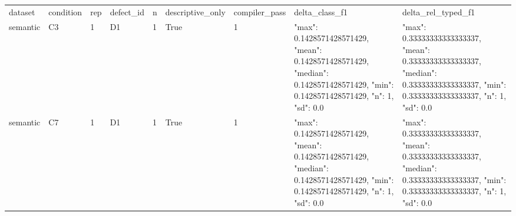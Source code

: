 \begin{tabular}{lllllllll}
dataset & condition & rep & defect\_id & n & descriptive\_only & compiler\_pass & delta\_class\_f1 & delta\_rel\_typed\_f1 \\
semantic & C3 & 1 & D1 & 1 & True & 1 & {"max": 0.1428571428571429, "mean": 0.1428571428571429, "median": 0.1428571428571429, "min": 0.1428571428571429, "n": 1, "sd": 0.0} & {"max": 0.33333333333333337, "mean": 0.33333333333333337, "median": 0.33333333333333337, "min": 0.33333333333333337, "n": 1, "sd": 0.0} \\
semantic & C7 & 1 & D1 & 1 & True & 1 & {"max": 0.1428571428571429, "mean": 0.1428571428571429, "median": 0.1428571428571429, "min": 0.1428571428571429, "n": 1, "sd": 0.0} & {"max": 0.33333333333333337, "mean": 0.33333333333333337, "median": 0.33333333333333337, "min": 0.33333333333333337, "n": 1, "sd": 0.0} \\
\end{tabular}